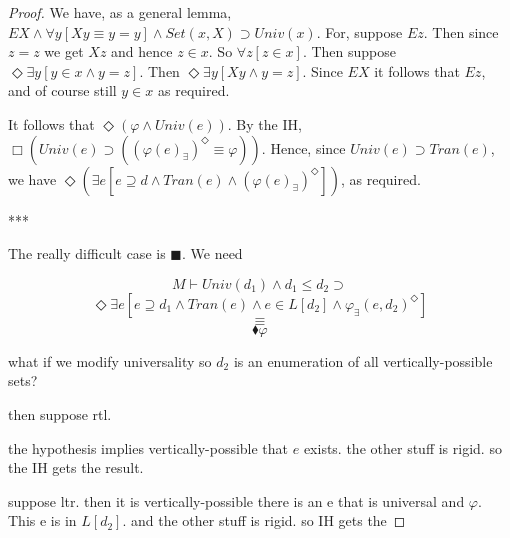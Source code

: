 \documentclass{article}
\newcommand\D{\blacklozenge}
\newcommand\B{\blacksquare}
\begin{document}
\begin{proof}
        We have, as a general lemma,
        $EX \wedge \forall y[Xy \equiv y = y] \wedge Set(x, X) \supset Univ(x)$.
        For, suppose $Ez$. Then since $z = z$ we get $Xz$ and hence $z \in x$. So 
        $\forall z[z \in x]$. Then suppose $\Diamond \exists y[y \in x \wedge y = z]$. 
        Then $\Diamond \exists y[Xy \wedge y = z]$. Since $EX$ it follows that $Ez$, 
        and of course still $y \in x$ as required.
    
        It follows that $\Diamond (\varphi \wedge Univ(e))$. By the IH, 
        $\Box (Univ(e) \supset ((\varphi(e)_\exists)^\Diamond \equiv \varphi))$. Hence,
        since $Univ(e) \supset Tran(e)$, we have 
        $\Diamond (\exists e[e  \supseteq d \wedge Tran(e) \wedge (\varphi(e)_\exists)^\Diamond])$,
        as required.
    
        ***

        The really difficult case is $\B$. We need
    
        $$M \vdash Univ(d_1) \wedge d_1 \leq d_2 \supset $$
        $$\Diamond \exists e[e \supseteq d_1 \wedge Tran(e) \wedge e \in L[d_2] \wedge \varphi_\exists(e, d_2)^\Diamond]$$
        $$\equiv $$
        $$\D \varphi$$

        what if we modify universality so $d_2$ is an enumeration of all
        vertically-possible sets?

        then suppose rtl. 

        the hypothesis implies vertically-possible that $e$ exists. the other stuff 
        is rigid. so the IH gets the result.

        suppose ltr. then it is vertically-possible there 
        is an e that is universal and $\varphi$. This e is in $L[d_2]$.
        and the other stuff is rigid. so IH gets the

    \end{proof}
    
\end{document}
